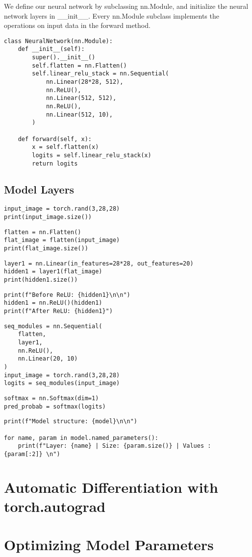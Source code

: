 \documentclass{article}
\begin{document}
We define our neural network by subclassing nn.Module, and initialize the 
neural network layers in \_\_init\_\_. Every nn.Module subclass implements the 
operations on input data in the forward method.

\begin{lstlisting}
class NeuralNetwork(nn.Module):
    def __init__(self):
        super().__init__()
        self.flatten = nn.Flatten()
        self.linear_relu_stack = nn.Sequential(
            nn.Linear(28*28, 512),
            nn.ReLU(),
            nn.Linear(512, 512),
            nn.ReLU(),
            nn.Linear(512, 10),
        )

    def forward(self, x):
        x = self.flatten(x)
        logits = self.linear_relu_stack(x)
        return logits
\end{lstlisting}

\subsection{Model Layers}

\begin{lstlisting}
input_image = torch.rand(3,28,28)
print(input_image.size())
\end{lstlisting}

\begin{lstlisting}
flatten = nn.Flatten()
flat_image = flatten(input_image)
print(flat_image.size())
\end{lstlisting}

\begin{lstlisting}
layer1 = nn.Linear(in_features=28*28, out_features=20)
hidden1 = layer1(flat_image)
print(hidden1.size())
\end{lstlisting}

\begin{lstlisting}
print(f"Before ReLU: {hidden1}\n\n")
hidden1 = nn.ReLU()(hidden1)
print(f"After ReLU: {hidden1}")
\end{lstlisting}

\begin{lstlisting}
seq_modules = nn.Sequential(
    flatten,
    layer1,
    nn.ReLU(),
    nn.Linear(20, 10)
)
input_image = torch.rand(3,28,28)
logits = seq_modules(input_image)
\end{lstlisting}

\begin{lstlisting}
softmax = nn.Softmax(dim=1)
pred_probab = softmax(logits)
\end{lstlisting}

\begin{lstlisting}
print(f"Model structure: {model}\n\n")

for name, param in model.named_parameters():
    print(f"Layer: {name} | Size: {param.size()} | Values : {param[:2]} \n")
\end{lstlisting}

\section{Automatic Differentiation with torch.autograd}

\section{Optimizing Model Parameters}
\end{document}
